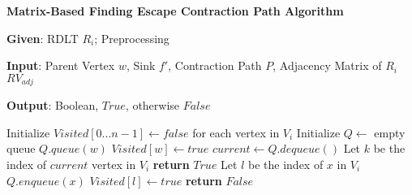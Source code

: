 \begin{algorithm}[H]
\caption{\textbf{Matrix-Based Finding Escape Contraction Path Algorithm}}
\label{alg: findEscapeConractionPath}
\textbf{Given}: RDLT $R_i$; Preprocessing


\textbf{Input}: Parent Vertex $w$, Sink $f'$, Contraction Path $P$, Adjacency Matrix of $R_i$ $RV_{adj}$

\textbf{Output}: Boolean, $True$, otherwise $False$  

\begin{algorithmic}[1]
    \State Initialize $Visited[0...n-1] \gets false$ \Comment for each vertex in $V_i$
    \State Initialize $Q \gets$ empty queue
    \State $Q.queue(w)$
    \State $Visited[w] \gets true$
        \State $current \gets Q.dequeue()$
        \State Let $k$ be the index of $current$ vertex in $V_i$
            \State \textbf{return }$True$
                \State  Let $l$ be the index of $x$ in $V_i$
                    \State $Q.enqueue(x)$
                    \State $Visited[l] \gets true$
                \EndIf
            \EndFor
        \EndIf
    \EndWhile
    \State \textbf{return }$False$
    
\end{algorithmic}
\end{algorithm}
